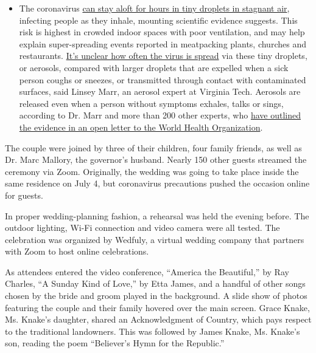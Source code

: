 \begin{itemize}
  \begin{itemize}
  \tightlist
  \item
    The coronavirus
    \href{https://www.nytimes.com/2020/07/04/health/239-experts-with-one-big-claim-the-coronavirus-is-airborne.html?action=click\&pgtype=Article\&state=default\&region=MAIN_CONTENT_3\&context=storylines_faq}{can
    stay aloft for hours in tiny droplets in stagnant air}, infecting
    people as they inhale, mounting scientific evidence suggests. This
    risk is highest in crowded indoor spaces with poor ventilation, and
    may help explain super-spreading events reported in meatpacking
    plants, churches and restaurants.
    \href{https://www.nytimes.com/2020/07/06/health/coronavirus-airborne-aerosols.html?action=click\&pgtype=Article\&state=default\&region=MAIN_CONTENT_3\&context=storylines_faq}{It's
    unclear how often the virus is spread} via these tiny droplets, or
    aerosols, compared with larger droplets that are expelled when a
    sick person coughs or sneezes, or transmitted through contact with
    contaminated surfaces, said Linsey Marr, an aerosol expert at
    Virginia Tech. Aerosols are released even when a person without
    symptoms exhales, talks or sings, according to Dr. Marr and more
    than 200 other experts, who
    \href{https://academic.oup.com/cid/article/doi/10.1093/cid/ciaa939/5867798}{have
    outlined the evidence in an open letter to the World Health
    Organization}.
  \end{itemize}
\end{itemize}

The couple were joined by three of their children, four family friends,
as well as Dr. Marc Mallory, the governor's husband. Nearly 150 other
guests streamed the ceremony via Zoom. Originally, the wedding was going
to take place inside the same residence on July 4, but coronavirus
precautions pushed the occasion online for guests.

In proper wedding-planning fashion, a rehearsal was held the evening
before. The outdoor lighting, Wi-Fi connection and video camera were all
tested. The celebration was organized by Wedfuly, a virtual wedding
company that partners with Zoom to host online celebrations.

As attendees entered the video conference, ``America the Beautiful,'' by
Ray Charles, ``A Sunday Kind of Love,'' by Etta James, and a handful of
other songs chosen by the bride and groom played in the background. A
slide show of photos featuring the couple and their family hovered over
the main screen. Grace Knake, Ms. Knake's daughter, shared an
Acknowledgment of Country, which pays respect to the traditional
landowners. This was followed by James Knake, Ms. Knake's son, reading
the poem ``Believer's Hymn for the Republic.''

